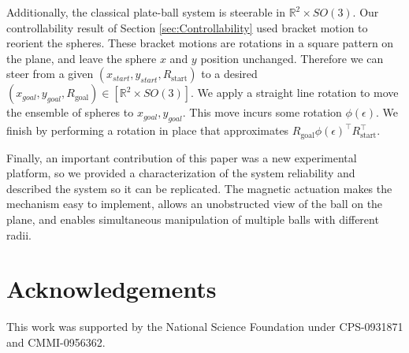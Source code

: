\documentclass[letter paper, 10pt, conference]{ieeeconf}
\providecommand{\field}[1]{\mathbb{#1}}
\providecommand{\R}{\field{R}}
\newcommand{\Rstart}{R_\text{start}}
\newcommand{\Rgoal}{R_\text{goal}}
\begin{document}
Additionally, the classical plate-ball system is steerable in $\R^2\times SO(3)$.  Our controllability result of Section \ref{sec:Controllability} used bracket motion to reorient the spheres.  These bracket motions are rotations in a square pattern on the plane, and leave the sphere $x$ and $y$ position unchanged.  Therefore we can steer from a given $(x_{start},y_{start},\Rstart)$ to a desired $(x_{goal},y_{goal},\Rgoal)\in [\R^2\times SO(3)]$.  We apply a straight line rotation to move the ensemble of spheres to $x_{goal},y_{goal}$.  This move incurs some rotation $\phi(\epsilon)$.   We finish by performing a rotation in place that approximates $\Rgoal \phi(\epsilon)^{\top} \Rstart^{\top}$. 

Finally, an important contribution of this paper was a new experimental platform, so we provided a characterization of the system reliability and described the system so it can be replicated.  The magnetic actuation makes the mechanism easy to implement, allows an unobstructed view of the ball on the plane, and enables simultaneous manipulation of multiple balls with different radii.

\section{Acknowledgements}
This work was supported by the National Science Foundation under CPS-0931871 and CMMI-0956362.






\end{document}

